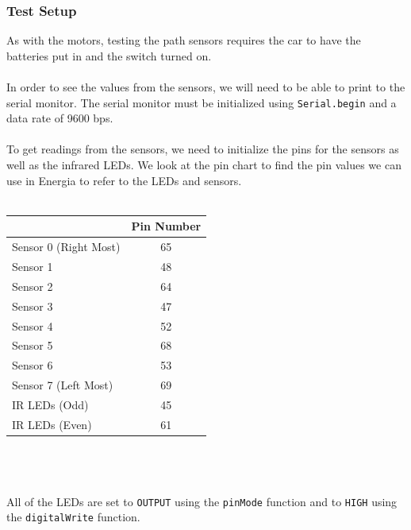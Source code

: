 \documentclass[12pt]{article}
\begin{document}
\subsubsection{Test Setup}
As with the motors, testing the path sensors requires the car to have the batteries put in and the switch turned on.
\\ \\ 
In order to see the values from the sensors, we will need to be able to print to the serial monitor. The serial monitor must be initialized using \texttt{Serial.begin} and a data rate of 9600 bps.
\\ \\ 
To get readings from the sensors, we need to initialize the pins for the sensors as well as the infrared LEDs. We look at the pin chart to find the pin values we can use in Energia to refer to the LEDs and sensors.
\\ \\ 
\begin{tabu}{|l|c|}
\hline
{} & \textbf{Pin Number} \\ \hline
Sensor 0 (Right Most) & 65 \\
Sensor 1              & 48 \\
Sensor 2              & 64 \\
Sensor 3              & 47 \\
Sensor 4              & 52 \\
Sensor 5              & 68 \\
Sensor 6              & 53 \\
Sensor 7 (Left Most)  & 69 \\
IR LEDs (Odd)         & 45 \\
IR LEDs (Even)        & 61 \\ \hline
\end{tabu}
\\ \\ \\ 
All of the LEDs are set to \texttt{OUTPUT} using the \texttt{pinMode} function and to \texttt{HIGH} using the \texttt{digitalWrite} function.

\end{document}
